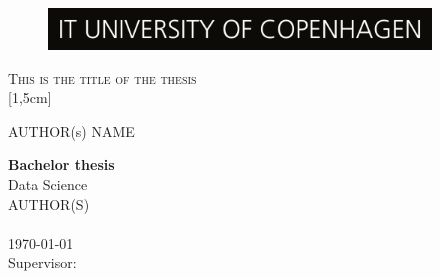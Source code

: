 \documentclass[
10pt, %
a4paper, %
oneside, %
headinclude,footinclude, %
] {book}%
\title{\normalfont\spacedallcaps{title}} %
\author{\spacedlowsmallcaps{author}} %
\date{} %
\begin{document}


\pagestyle{scrheadings} %



\hypersetup{pageanchor=false}
\begin{titlepage}
\thispagestyle{empty}
\begin{figure}[h!] %
\centering
\includegraphics[width=4in]{ITUlogo} 
\end{figure}

\begin{center}
\vspace{30 mm}
\begingroup \linespread{1,75} \selectfont 
\textsc{\LARGE This is the title of the thesis}\\
[1,5cm]
\endgroup

AUTHOR(s) NAME\\[2,5cm]

\end{center}
\vfill
\textbf{Bachelor thesis}\\  %
Data Science\\  
AUTHOR(S)\\
\\
\today\\
Supervisor: 
\end{titlepage}
\hypersetup{pageanchor=true}
\end{document}
